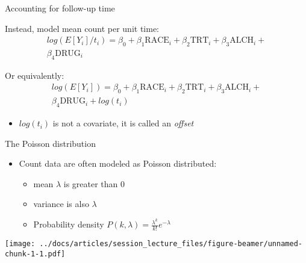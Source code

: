 \documentclass[
  ignorenonframetext,
]{beamer}
\providecommand{\tightlist}{%
  \setlength{\itemsep}{0pt}\setlength{\parskip}{0pt}}
\begin{document}
\begin{frame}{Accounting for follow-up time}
\protect\hypertarget{accounting-for-follow-up-time}{}

Instead, model mean count per unit time: \[
\begin{aligned}
log(E[Y_i]/t_i) = \beta_0 + \beta_1 \textrm{RACE}_i + \beta_2 \textrm{TRT}_i + 
\beta_3 \textrm{ALCH}_i + \nonumber \\ \beta_4 \textrm{DRUG}_i
\end{aligned}
\]

Or equivalently: \[
\begin{aligned}
log(E[Y_i]) = \beta_0 + \beta_1 \textrm{RACE}_i + \beta_2 \textrm{TRT}_i + 
\beta_3 \textrm{ALCH}_i + \nonumber \\ \beta_4 \textrm{DRUG}_i + log(t_i)
\end{aligned}
\]

\begin{itemize}
\tightlist
\item
  \(log(t_i)\) is not a covariate, it is called an \emph{offset}
\end{itemize}

\end{frame}

\begin{frame}{The Poisson distribution}
\protect\hypertarget{the-poisson-distribution}{}

\begin{itemize}
\tightlist
\item
  Count data are often modeled as Poisson distributed:

  \begin{itemize}
  \tightlist
  \item
    mean \(\lambda\) is greater than 0
  \item
    variance is also \(\lambda\)
  \item
    Probability density
    \(P(k, \lambda) = \frac{\lambda^k}{k!} e^{-\lambda}\)
  \end{itemize}
\end{itemize}

\texttt{[image: ../docs/articles/session\_lecture\_files/figure-beamer/unnamed-chunk-1-1.pdf]}

\end{frame}
\end{document}
